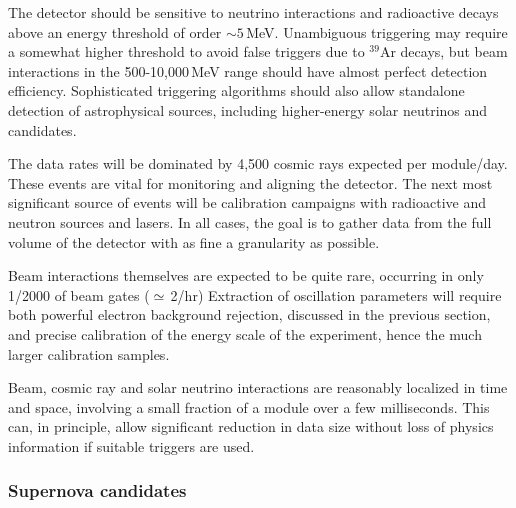 \documentclass[../main-v1.tex]{subfiles}
\begin{document}

The detector should be sensitive to neutrino interactions and radioactive decays above an energy threshold of order $\sim 5$\,MeV.  Unambiguous triggering may require a somewhat higher threshold  to avoid false triggers due to $^{39}$Ar decays,  but beam interactions in the 500-10,000\,MeV range should have almost perfect detection efficiency. Sophisticated triggering algorithms should also allow standalone detection of astrophysical sources, including higher-energy solar neutrinos and  candidates. 

The data rates will be dominated by 4,500 cosmic rays expected per module/day.  These events are vital for monitoring and aligning the detector. %
The next most significant source of events will be calibration campaigns with radioactive and neutron sources and lasers.  In all cases, the goal is to gather data from the full volume of the detector with as fine a granularity as possible. 

Beam interactions themselves are expected to be quite rare, occurring in only 1/2000 of beam gates ($\simeq$\,2/hr)  Extraction of oscillation parameters will require both powerful electron background rejection, discussed in the previous section,  and precise calibration of the energy scale of the experiment, hence the much larger calibration samples.

Beam, cosmic ray and solar neutrino interactions are reasonably localized in time and space, involving a small fraction of a module over a few milliseconds.  This can, in principle, allow significant reduction in data size without loss of physics information if suitable triggers are used.


\subsubsection{Supernova candidates }\label{sec:supernova}
\end{document}
